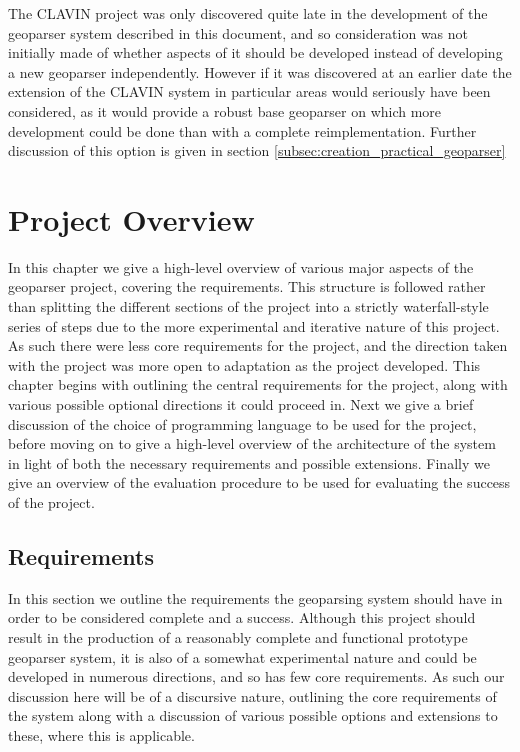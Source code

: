 \documentclass[12pt, a4paper]{report}
\begin{document}
The CLAVIN project was only discovered quite late in the development of the geoparser system described in this document, and so consideration was not initially made of whether aspects of it should be developed instead of developing a new geoparser independently. However if it was discovered at an earlier date the extension of the CLAVIN system in particular areas would seriously have been considered, as it would provide a robust base geoparser on which more development could be done than with a complete reimplementation. Further discussion of this option is given in section \ref{subsec:creation_practical_geoparser} 

\chapter{Project Overview}
\label{chap:project_overview}

In this chapter we give a high-level overview of various major aspects of the geoparser project, covering the requirements. This structure is followed rather than splitting the different sections of the project into a strictly waterfall-style series of steps due to the more experimental and iterative nature of this project. As such there were less core requirements for the project, and the direction taken with the project was more open to adaptation as the project developed. This chapter begins with outlining the central requirements for the project, along with various possible optional directions it could proceed in. Next we give a brief discussion of the choice of programming language to be used for the project, before moving on to give a high-level overview of the architecture of the system in light of both the necessary requirements and possible extensions. Finally we give an overview of the evaluation procedure to be used for evaluating the success of the project.

\section{Requirements}
\label{sec:requirements}


In this section we outline the requirements the geoparsing system should have in order to be considered complete and a success. Although this project should result in the production of a reasonably complete and functional prototype geoparser system, it is also of a somewhat experimental nature and could be developed in numerous directions, and so has few core requirements. As such our discussion here will be of a discursive nature, outlining the core requirements of the system along with a discussion of various possible options and extensions to these, where this is applicable. 
\end{document}
